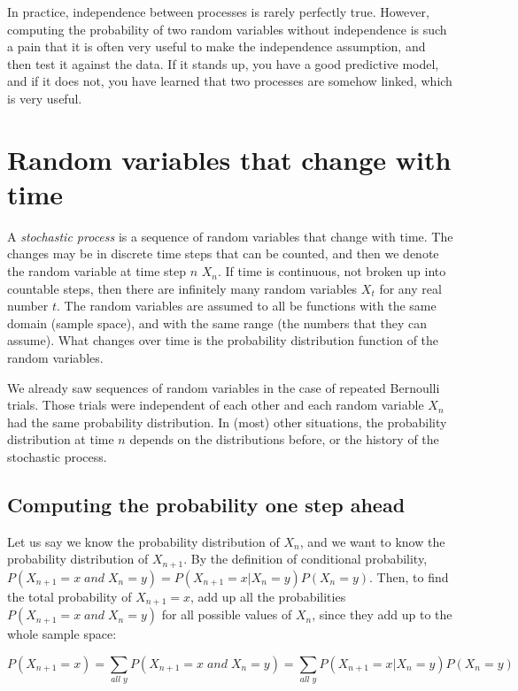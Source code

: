 \documentclass[
  letterpaper,
  DIV=11,
  numbers=noendperiod]{scrreprt}
\begin{document}
In practice, independence between processes is rarely perfectly true.
However, computing the probability of two random variables without
independence is such a pain that it is often very useful to make the
independence assumption, and then test it against the data. If it stands
up, you have a good predictive model, and if it does not, you have
learned that two processes are somehow linked, which is very useful.

\section{Random variables that change with
time}\label{random-variables-that-change-with-time}

A \emph{stochastic process} is a sequence of random variables that
change with time. The changes may be in discrete time steps that can be
counted, and then we denote the random variable at time step \(n\)
\(X_n\). If time is continuous, not broken up into countable steps, then
there are infinitely many random variables \(X_t\) for any real number
\(t\). The random variables are assumed to all be functions with the
same domain (sample space), and with the same range (the numbers that
they can assume). What changes over time is the probability distribution
function of the random variables.

We already saw sequences of random variables in the case of repeated
Bernoulli trials. Those trials were independent of each other and each
random variable \(X_n\) had the same probability distribution. In (most)
other situations, the probability distribution at time \(n\) depends on
the distributions before, or the history of the stochastic process.

\subsection{Computing the probability one step
ahead}\label{computing-the-probability-one-step-ahead}

Let us say we know the probability distribution of \(X_n\), and we want
to know the probability distribution of \(X_{n+1}\). By the definition
of conditional probability,
\(P(X_{n+1} = x \; and \; X_n = y) = P(X_{n+1} =x | X_n = y) P(X_n = y)\).
Then, to find the total probability of \(X_{n+1} = x\), add up all the
probabilities \(P(X_{n+1} = x \; and \; X_n=y)\) for all possible values
of \(X_n\), since they add up to the whole sample space:

\[ 
P(X_{n+1} = x) = \sum _ {all \; y} P(X_{n+1} = x \; and \; X_n = y) = \sum _ {all \; y} P(X_{n+1} =x | X_n = y) P(X_n = y)
\]
\end{document}
